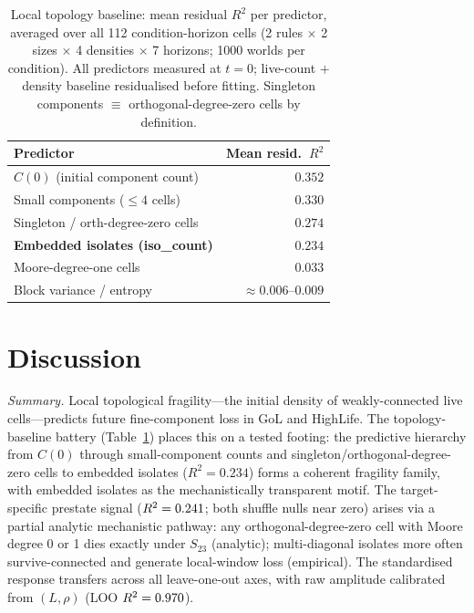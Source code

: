 \documentclass[aip,cha,preprint,nofootinbib]{revtex4-2}
\newcommand{\topCompCountR}{0.352}
\newcommand{\topSmallLeqFourR}{0.330}
\newcommand{\topSingletonR}{0.274}
\newcommand{\topIsoEmbeddedR}{0.234}
\newcommand{\topMooreDegOneR}{0.033}
\begin{document}
\begin{table}[htbp]
\centering
\caption{Local topology baseline: mean residual $R^2$ per predictor,
averaged over all 112 condition-horizon cells
(2 rules $\times$ 2 sizes $\times$ 4 densities $\times$ 7 horizons;
1000 worlds per condition).
All predictors measured at $t{=}0$; live-count $+$ density baseline
residualised before fitting.
Singleton components $\equiv$ orthogonal-degree-zero cells by definition.}
\label{tab:topology_baselines}
\begin{tabular}{lr}
\toprule
Predictor & Mean resid.\ $R^2$ \\
\midrule
$C(0)$ (initial component count)   & $\topCompCountR$ \\
Small components ($\leq 4$ cells)   & $\topSmallLeqFourR$ \\
Singleton / orth-degree-zero cells  & $\topSingletonR$ \\
\textbf{Embedded isolates (iso\_count)} & $\mathbf{\topIsoEmbeddedR}$ \\
Moore-degree-one cells              & $\topMooreDegOneR$ \\
Block variance / entropy            & ${\approx}0.006$--$0.009$ \\
\bottomrule
\end{tabular}
\end{table}

\section{Discussion}
\label{sec:discussion}

\textit{Summary.}
Local topological fragility---the initial density of weakly-connected live
cells---predicts future fine-component loss in GoL and HighLife.
The topology-baseline battery (Table~\ref{tab:topology_baselines}) places
this on a tested footing: the predictive hierarchy from $C(0)$ through
small-component counts and singleton/orthogonal-degree-zero cells to
embedded isolates ($R^2 = \topIsoEmbeddedR$) forms a coherent fragility
family, with embedded isolates as the mechanistically transparent motif.
The target-specific prestate signal ($R^2 = 0.241$; both shuffle
nulls near zero) arises via a partial analytic mechanistic pathway: any
orthogonal-degree-zero cell with Moore degree 0 or 1 dies exactly under
$S_{23}$ (analytic); multi-diagonal isolates more often survive-connected
and generate local-window loss (empirical).
The standardised response transfers across all leave-one-out axes, with
raw amplitude calibrated from $(L,\rho)$ (LOO $R^2 = 0.970$).
\end{document}
